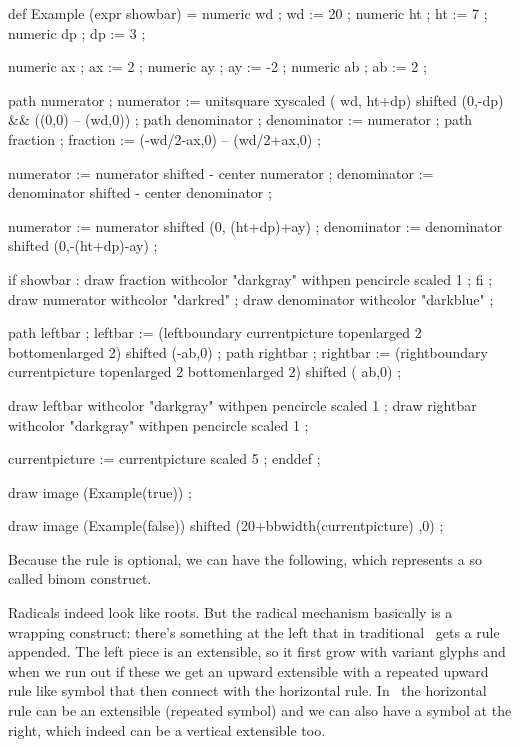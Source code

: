 \startlinecorrection
\startMPcode
    def Example (expr showbar) =
        numeric wd ; wd := 20 ;
        numeric ht ; ht :=  7 ;
        numeric dp ; dp :=  3 ;

        numeric ax ; ax :=  2 ;
        numeric ay ; ay := -2 ;
        numeric ab ; ab :=  2 ;

        path numerator   ; numerator   := unitsquare xyscaled ( wd, ht+dp) shifted (0,-dp) && ((0,0) -- (wd,0)) ;
        path denominator ; denominator := numerator ;
        path fraction    ; fraction    := (-wd/2-ax,0) -- (wd/2+ax,0) ;

        numerator   := numerator   shifted - center numerator ;
        denominator := denominator shifted - center denominator ;

        numerator   := numerator   shifted (0, (ht+dp)+ay) ;
        denominator := denominator shifted (0,-(ht+dp)-ay) ;

        if showbar :
            draw fraction    withcolor "darkgray" withpen pencircle scaled 1 ;
        fi ;
        draw numerator   withcolor "darkred"  ;
        draw denominator withcolor "darkblue" ;

        path leftbar  ; leftbar  := (leftboundary  currentpicture topenlarged 2 bottomenlarged 2) shifted (-ab,0) ;
        path rightbar ; rightbar := (rightboundary currentpicture topenlarged 2 bottomenlarged 2) shifted ( ab,0) ;

        draw leftbar  withcolor "darkgray" withpen pencircle scaled 1 ;
        draw rightbar withcolor "darkgray" withpen pencircle scaled 1 ;

        currentpicture := currentpicture scaled 5 ;
    enddef ;

    draw image (Example(true)) ;

    draw image (Example(false)) shifted (20+bbwidth(currentpicture) ,0) ;

\stopMPcode
\stoplinecorrection

Because the rule is optional, we can have the following, which represents a so
called binom construct.

\stopsection

\startsection[title=Math radicals]

Radicals indeed look like roots. But the radical mechanism basically is a
wrapping construct: there's something at the left that in traditional \TEX\ gets
a rule appended. The left piece is an extensible, so it first grow with variant
glyphs and when we run out if these we get an upward extensible with a repeated
upward rule like symbol that then connect with the horizontal rule. In
\LUAMETATEX\ the horizontal rule can be an extensible (repeated symbol) and we
can also have a symbol at the right, which indeed can be a vertical extensible
too.

